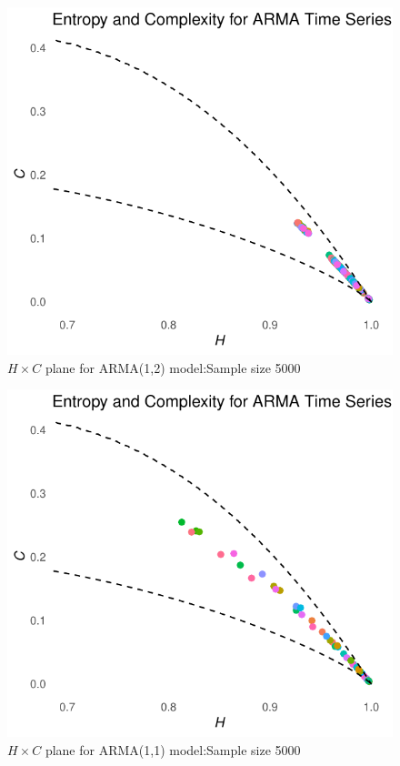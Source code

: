 \documentclass[12pt,a4paper]{article}
\begin{document}
\begin{figure}[H]
	\includegraphics[width=0.8 \textwidth]{HC plane ARMA12 n5000}
	\caption{$H \times C$ plane for ARMA(1,2) model:Sample size 5000}
	\label{fig:HC ARMA(12)}
\end{figure}


\begin{figure}[H]
	\includegraphics[width=0.8 \textwidth]{HC plane ARMA(11) n5000}
	\caption{$H \times C$ plane for ARMA(1,1) model:Sample size 5000}
	\label{fig:HC ARMA(11)}
\end{figure}
\end{document}
